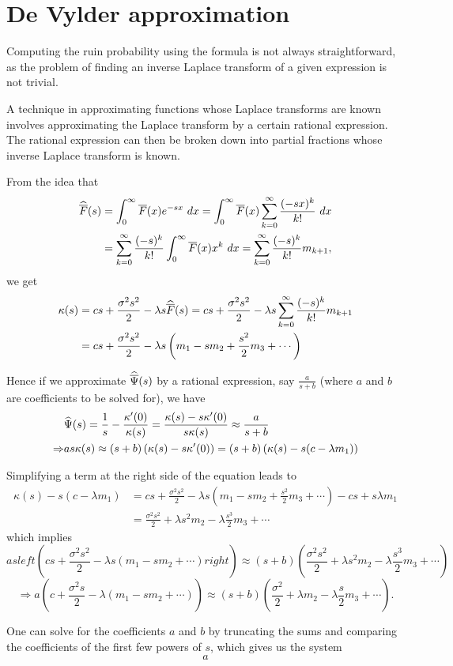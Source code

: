 \section{De Vylder approximation}

Computing the ruin probability using the \PK formula is not always straightforward, as the problem of finding an inverse Laplace transform of a given expression is not trivial.

A technique in approximating functions whose Laplace transforms are known involves approximating the Laplace transform by a certain rational expression. The rational expression can then be broken down into partial fractions whose inverse Laplace transform is known.

From the idea that
\begin{align*}
\widehat{\overline{F}}(s) &= \int_{0}^{\infty} \overline{F}(x) e^{-sx} ~dx = \int_{0}^{\infty} \overline{F}(x) \sum_{k=0}^{\infty} \frac{(-sx)^k}{k!} ~dx \\
& = \sum_{k=0}^{\infty} \frac{(-s)^k}{k!} \int_{0}^{\infty} \overline{F}(x) x^k ~dx = \sum_{k=0}^{\infty} \frac{(-s)^k}{k!} m_{k+1},
\end{align*}
we get
\begin{align*}
\kappa(s) &= cs + \frac{\sigma^2 s^2}{2} - \lambda s \widehat{\overline{F}}(s) = cs + \frac{\sigma^2 s^2}{2} - \lambda s \sum_{k=0}^{\infty} \frac{(-s)^k}{k!} m_{k+1}\\
&= cs + \frac{\sigma^2 s^2}{2} - \lambda s \left( m_1 - s m_2 +  \frac{s^2}{2} m_3 + \cdots \right)
\end{align*}

Hence if we approximate $\widehat{\overline{\Psi}}(s)$ by a rational expression, say $\frac{a}{s+b}$ (where $a$ and $b$ are coefficients to be solved for), we have
\begin{align*}
& \widehat {\Psi}(s) = \frac{1}{s} - \frac{\kappa^{\prime}(0)}{\kappa (s)} = \frac{\kappa (s) - s \kappa^{\prime} (0)}{s \kappa (s)}  \approx \frac{a}{s+b} \\
\Rightarrow & as \kappa (s) \approx (s+b) \left( \kappa (s) - s \kappa^{\prime} (0) \right) = (s+b) \left( \kappa (s) - s (c- \lambda m_1) \right)
\end{align*}

Simplifying a term at the right side of the equation leads to 
\begin{align*}
\kappa (s) - s (c- \lambda m_1) & = cs + \frac{\sigma^2 s^2}{2} - \lambda s \left( m_1 - s m_2 +  \frac{s^2}{2} m_3 + \cdots \right) -cs + s\lambda m_1\\
& = \frac{\sigma^2 s^2}{2} + \lambda s^2 m_2 - \lambda \frac{s^3}{2} m_3 + \cdots
\end{align*}
which implies
\[
as left( cs + \frac{\sigma^2 s^2}{2} - \lambda s \left( m_1 - s m_2 + \cdots \right) right) \approx (s+b) \left( \frac{\sigma^2 s^2}{2} + \lambda s^2 m_2 - \lambda \frac{s^3}{2} m_3 + \cdots \right)
\]
\[
\Rightarrow a \left( c + \frac{\sigma^2 s}{2} - \lambda \left( m_1 - s m_2 + \cdots \right) \right) \approx (s+b) \left( \frac{\sigma^2}{2} + \lambda m_2 - \lambda \frac{s}{2} m_3 + \cdots \right).
\]

One can solve for the coefficients $a$ and $b$ by truncating the sums and comparing the coefficients of the first few powers of $s$, which gives us the system
\[
a
\]